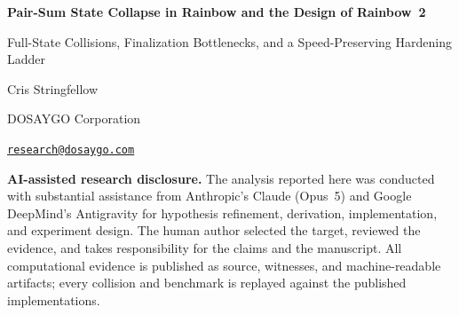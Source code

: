 \documentclass[10pt]{article}
\theoremstyle{definition}
\begin{document}
\begin{center}
  {\LARGE\bfseries\color{Navy} Pair-Sum State Collapse in Rainbow and the Design of Rainbow~2}\par
  \vspace{0.3em}
  {\large Full-State Collisions, Finalization Bottlenecks, and a Speed-Preserving Hardening Ladder}\par
  \vspace{0.6em}
  {\large Cris Stringfellow}\par
  DOSAYGO Corporation\par
  \href{mailto:research@dosaygo.com}{\texttt{research@dosaygo.com}}
\end{center}

\noindent\textbf{AI-assisted research disclosure.}
The analysis reported here was conducted with substantial assistance from Anthropic's Claude (Opus~5) and Google DeepMind's Antigravity for hypothesis refinement, derivation, implementation, and experiment design. The human author selected the target, reviewed the evidence, and takes responsibility for the claims and the manuscript. All computational evidence is published as source, witnesses, and machine-readable artifacts; every collision and benchmark is replayed against the published implementations.
\end{document}

